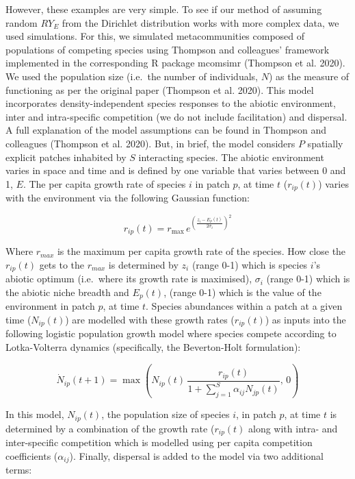 \documentclass[
  letterpaper,
  DIV=11,
  numbers=noendperiod]{scrartcl}
\begin{document}
However, these examples are very simple. To see if our method of
assuming random \(RY_E\) from the Dirichlet distribution works with more
complex data, we used simulations. For this, we simulated
metacommunities composed of populations of competing species using
Thompson and colleagues' framework implemented in the corresponding R
package mcomsimr (Thompson et al. 2020). We used the population size
(i.e.~the number of individuals, \(N\)) as the measure of functioning as
per the original paper (Thompson et al. 2020). This model incorporates
density-independent species responses to the abiotic environment, inter
and intra-specific competition (we do not include facilitation) and
dispersal. A full explanation of the model assumptions can be found in
Thompson and colleagues (Thompson et al. 2020). But, in brief, the model
considers \(P\) spatially explicit patches inhabited by \(S\)
interacting species. The abiotic environment varies in space and time
and is defined by one variable that varies between 0 and 1, \(E\). The
per capita growth rate of species \(i\) in patch \(p\), at time \(t\)
(\(r_{ip}(t)\)) varies with the environment via the following Gaussian
function:

\[
r_{ip}(t) = r_{\text{max}} \, e^{\left(\frac{z_i - E_p(t)}{2\sigma_i}\right)^2} \tag{Equation S10}
\]

Where \(r_{max}\) is the maximum per capita growth rate of the species.
How close the \(r_{ip}(t)\) gets to the \(r_{max}\) is determined by
\(z_i\) (range 0-1) which is species \(i\)'s abiotic optimum (i.e.~where
its growth rate is maximised), \(\sigma_i\) (range 0-1) which is the
abiotic niche breadth and \(E_p(t)\), (range 0-1) which is the value of
the environment in patch \(p\), at time \(t\). Species abundances within
a patch at a given time (\(N_{ip}(t)\)) are modelled with these growth
rates (\(r_{ip}(t)\)) as inputs into the following logistic population
growth model where species compete according to Lotka-Volterra dynamics
(specifically, the Beverton-Holt formulation):

\[
\dot{N}_{ip}(t + 1) = \max\left(N_{ip}(t) \, \frac{r_{ip}(t)}{1 + \sum_{j=1}^{S} \alpha_{ij} N_{jp}(t)}, \, 0\right) \tag{Equation S11}
\]

In this model, \(N_{ip}(t)\), the population size of species \(i\), in
patch \(p\), at time \(t\) is determined by a combination of the growth
rate (\(r_{ip}(t)\) along with intra- and inter-specific competition
which is modelled using per capita competition coefficients
(\(\alpha_{ij}\)). Finally, dispersal is added to the model via two
additional terms:
\end{document}
